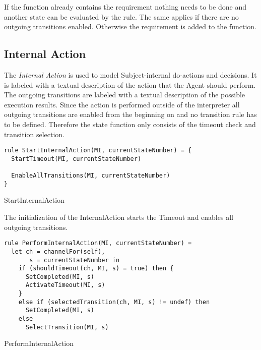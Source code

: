 If the  function already contains the
 requirement nothing needs to be done and another
state can be evaluated by the  rule.
The same applies if there are no outgoing transitions enabled.
Otherwise the requirement is added to the  function.


\subsection{Internal Action}


The \emph{Internal Action} is used to model Subject-internal do-actions and
decisions. It is labeled with a textual description of the action that the Agent
should perform. The outgoing transitions are labeled with a textual description of the
possible execution results. Since the action is performed outside of the
interpreter all outgoing transitions are enabled from the beginning on and no
transition rule has to be defined. Therefore the state function only consists of the
timeout check and transition selection.


\begin{listing}[H]
\begin{verbatim}
rule StartInternalAction(MI, currentStateNumber) = {
  StartTimeout(MI, currentStateNumber)

  EnableAllTransitions(MI, currentStateNumber)
}
\end{verbatim}
\caption{StartInternalAction}
\label{lst:shortasm:StartInternalAction}
\end{listing}



The initialization of the InternalAction starts the Timeout and enables all
outgoing transitions.


\begin{listing}[H]
\begin{verbatim}
rule PerformInternalAction(MI, currentStateNumber) =
  let ch = channelFor(self),
       s = currentStateNumber in
    if (shouldTimeout(ch, MI, s) = true) then {
      SetCompleted(MI, s)
      ActivateTimeout(MI, s)
    }
    else if (selectedTransition(ch, MI, s) != undef) then
      SetCompleted(MI, s)
    else
      SelectTransition(MI, s)
\end{verbatim}
\caption{PerformInternalAction}
\label{lst:shortasm:PerformInternalAction}
\end{listing}


